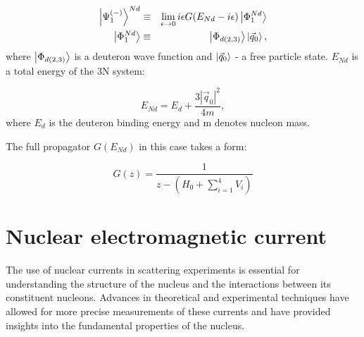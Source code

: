     \begin{eqnarray}
        \ket{\Psi^{(-)}_1}^{Nd} &\equiv& \lim_{\epsilon \rightarrow 0} 
        i \epsilon G(E_{Nd} - i\epsilon)\ket{\Phi^{Nd}_1}\\
        \ket{\Phi^{Nd}_1} &\equiv& \ket{\Phi_{d(2,3)}}\ket{\vec{q}_0},
    \end{eqnarray}
    where $\ket{\Phi_{d(2,3)}}$ is a deuteron wave function and 
    $\ket{\vec{q}_0}$ - a free particle state. $E_{Nd}$
    is a total energy of the 3N system:

    \begin{equation}
        E_{Nd} = E_d + \frac{3 |\vec{q}_0|^2}{4m},
    \end{equation}
    where $E_d$ is the deuteron binding energy and m denotes nucleon mass. 

    The full propagator $G(E_{Nd})$ in this case takes a form:
    
    \begin{equation}
        G(z)= \frac{1}{z - (H_0 + \sum_{i=1}^4V_i)}
    \end{equation}


    \section{Nuclear electromagnetic current}
    \label{sec_current}
    
    The use of nuclear currents in scattering experiments is essential for understanding the structure of the nucleus and the interactions between its constituent nucleons. Advances in theoretical and experimental techniques have allowed for more precise measurements of these currents and have provided insights into the fundamental properties of the nucleus.


